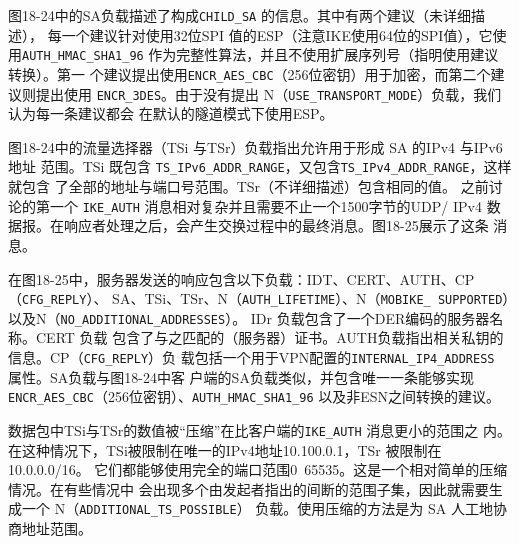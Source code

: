图18-24中的SA负载描述了构成\verb|CHILD_SA| 的信息。其中有两个建议（未详细描述），
每一个建议针对使用32位SPI 值的ESP（注意IKE使用64位的SPI值），它使用\verb|AUTH_HMAC_SHA1_96|
 作为完整性算法，并且不使用扩展序列号（指明使用建议转换）。第一
个建议提出使用\verb|ENCR_AES_CBC|（256位密钥）用于加密，而第二个建议则提出使用
\verb|ENCR_3DES|。由于没有提出 N（\verb|USE_TRANSPORT_MODE|）负载，我们认为每一条建议都会
在默认的隧道模式下使用ESP。

图18-24中的流量选择器（TSi 与TSr）负载指出允许用于形成 SA 的IPv4 与IPv6地址
范围。TSi 既包含 \verb|TS_IPv6_ADDR_RANGE|，又包含\verb|TS_IPv4_ADDR_RANGE|，这样就包含
了全部的地址与端口号范围。TSr（不详细描述）包含相同的值。
之前讨论的第一个 \verb|IKE_AUTH| 消息相对复杂并且需要不止一个1500字节的UDP/
IPv4 数据报。在响应者处理之后，会产生交换过程中的最终消息。图18-25展示了这条
消息。

在图18-25中，服务器发送的响应包含以下负载：IDT、CERT、AUTH、CP（\verb|CFG_REPLY|）、
SA、TSi、TSr、N（\verb|AUTH_LIFETIME|）、N（\verb|MOBIKE_ SUPPORTED|）以及N（\verb|NO_ADDITIONAL_ADDRESSES|）。
IDr 负载包含了一个DER编码的服务器名称。CERT 负载
包含了与之匹配的（服务器）证书。AUTH负载指出相关私钥的信息。CP（\verb|CFG_REPLY|）负
载包括一个用于VPN配置的\verb|INTERNAL_IP4_ADDRESS| 属性。SA负载与图18-24中客
户端的SA负载类似，并包含唯一一条能够实现 \verb|ENCR_AES_CBC|（256位密钥）、\verb|AUTH_HMAC_SHA1_96|
以及非ESN之间转换的建议。

数据包中TSi与TSr的数值被“压缩”在比客户端的\verb|IKE_AUTH| 消息更小的范围之
内。在这种情况下，TSi被限制在唯一的IPv4地址10.100.0.1，TSr 被限制在10.0.0.0/16。
它们都能够使用完全的端口范围0~65535。这是一个相对简单的压缩情况。在有些情况中
会出现多个由发起者指出的间断的范围子集，因此就需要生成一个 N（\verb|ADDITIONAL_TS_POSSIBLE|）
负载。使用压缩的方法是为 SA 人工地协商地址范围。

